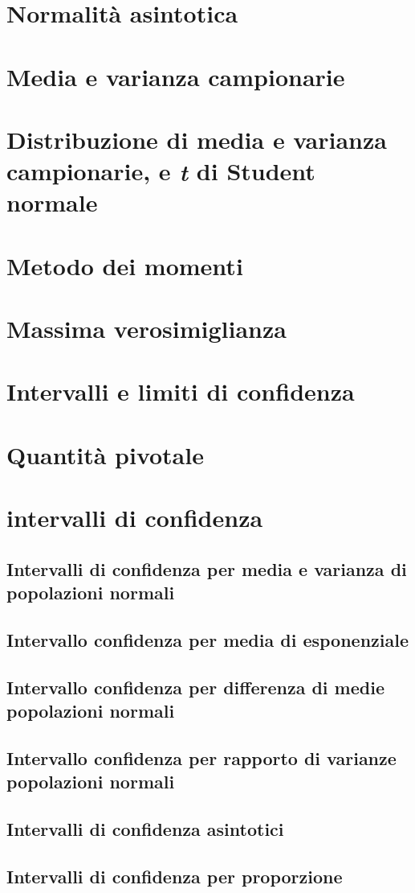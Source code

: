     \section{Normalità asintotica}
    \section{Media e varianza campionarie}
    \section{Distribuzione di media e varianza campionarie, e \textit{t} di Student normale}
    \section{Metodo dei momenti}
    \section{Massima verosimiglianza}
    \section{Intervalli e limiti di confidenza}
    \section{Quantità pivotale}
    \section{intervalli di confidenza}
        \subsection{Intervalli di confidenza per media e varianza di popolazioni normali}
        \subsection{Intervallo confidenza per media di esponenziale}
        \subsection{Intervallo confidenza per differenza di medie popolazioni normali}
        \subsection{Intervallo confidenza per rapporto di varianze popolazioni normali}
        \subsection{Intervalli di confidenza asintotici}
        \subsection{Intervalli di confidenza per proporzione}
        
